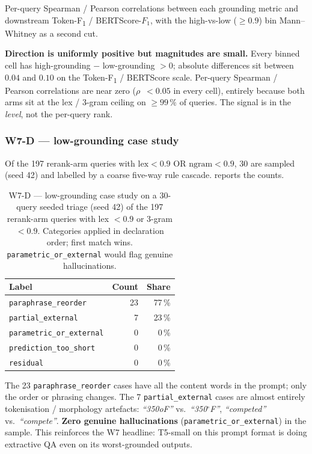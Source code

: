 \documentclass[11pt,a4paper]{article}
\newcommand{\F}{F\textsubscript{1}}
\newcommand{\Tokenf}{Token-\F}
\newcommand{\bertscore}{BERTScore}
\begin{document}
Per-query Spearman / Pearson correlations between each grounding
metric and downstream \Tokenf{} / \bertscore{}-$F_1$, with the
high-vs-low ($\geq\!0.9$) bin Mann--Whitney as a second cut.

\textbf{Direction is uniformly positive but magnitudes are small.}
Every binned cell has high-grounding $-$ low-grounding $>\!0$;
absolute differences sit between $0.04$ and $0.10$ on the
\Tokenf{} / \bertscore{} scale.  Per-query Spearman / Pearson
correlations are near zero (\textbar$\rho$\textbar~$<\!0.05$ in
every cell), entirely because both arms sit at the lex / 3-gram
ceiling on $\geq\!99\,\%$ of queries.  The signal is in the
\emph{level}, not the per-query rank.

\subsubsection{W7-D --- low-grounding case study}

Of the 197 rerank-arm queries with $\mathrm{lex}\!<\!0.9$ OR
$\mathrm{ngram}\!<\!0.9$, 30 are sampled (seed 42) and labelled by
a coarse five-way rule cascade.   reports the
counts.

\begin{table}[H]
  \centering
  \caption{W7-D --- low-grounding case study on a 30-query seeded
  triage (seed 42) of the 197 rerank-arm queries with
  lex $<\!0.9$ or 3-gram $<\!0.9$.  Categories applied in
  declaration order; first match wins.
  \texttt{parametric\_or\_external} would flag genuine
  hallucinations.}
  \label{tab:w7d}
  \begin{tabular}{lrr}
    \toprule
    Label                       & Count & Share \\
    \midrule
    \texttt{paraphrase\_reorder}     & 23 & 77\,\% \\
    \texttt{partial\_external}       &  7 & 23\,\% \\
    \texttt{parametric\_or\_external} & 0 &  0\,\% \\
    \texttt{prediction\_too\_short}  &  0 &  0\,\% \\
    \texttt{residual}                &  0 &  0\,\% \\
    \bottomrule
  \end{tabular}
\end{table}

The 23 \texttt{paraphrase\_reorder} cases have all the content
words in the prompt; only the order or phrasing changes.  The 7
\texttt{partial\_external} cases are almost entirely
tokenisation / morphology artefacts: \emph{``350oF''} vs.\
\emph{``350$^\circ$F''}, \emph{``competed''} vs.\ \emph{``compete''}.
\textbf{Zero genuine hallucinations} (\texttt{parametric\_or\_external})
in the sample.  This reinforces the W7 headline: T5-small on this
prompt format is doing extractive QA even on its worst-grounded
outputs.
\end{document}
